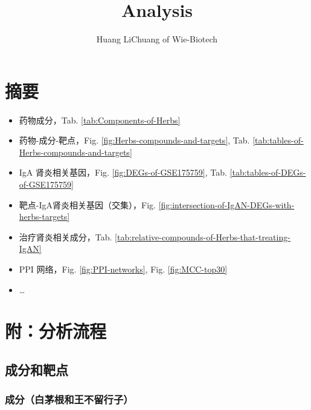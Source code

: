 \documentclass[
]{article}
\title{Analysis}
\author{Huang LiChuang of Wie-Biotech}
\date{}
\providecommand{\tightlist}{%
  \setlength{\itemsep}{0pt}\setlength{\parskip}{0pt}}
\begin{document}
\maketitle

{
\setcounter{tocdepth}{3}
\tableofcontents
}
\listoffigures

\listoftables

\hypertarget{abstract}{%
\section{摘要}\label{abstract}}

\begin{itemize}
\tightlist
\item
  药物成分，Tab. \ref{tab:Components-of-Herbs}
\item
  药物-成分-靶点，Fig. \ref{fig:Herbs-compounds-and-targets}, Tab. \ref{tab:tables-of-Herbs-compounds-and-targets}
\item
  IgA 肾炎相关基因，Fig. \ref{fig:DEGs-of-GSE175759}, Tab. \ref{tab:tables-of-DEGs-of-GSE175759}
\item
  靶点-IgA肾炎相关基因（交集），Fig. \ref{fig:intersection-of-IgAN-DEGs-with-herbs-targets}
\item
  治疗肾炎相关成分，Tab. \ref{tab:relative-compounds-of-Herbs-that-treating-IgAN}
\item
  PPI 网络，Fig. \ref{fig:PPI-networks}, Fig. \ref{fig:MCC-top30}
\item
  \ldots{}
\end{itemize}

\hypertarget{workflow}{%
\section{附：分析流程}\label{workflow}}

\hypertarget{ux6210ux5206ux548cux9776ux70b9}{%
\subsection{成分和靶点}\label{ux6210ux5206ux548cux9776ux70b9}}

\hypertarget{ux6210ux5206ux767dux8305ux6839ux548cux738bux4e0dux7559ux884cux5b50}{%
\subsubsection{成分（白茅根和王不留行子）}\label{ux6210ux5206ux767dux8305ux6839ux548cux738bux4e0dux7559ux884cux5b50}}
\end{document}
